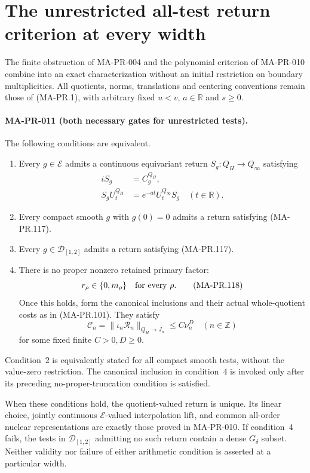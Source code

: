 \section{The unrestricted all-test return criterion at every width}
\label{sec:all-width-return-corollary}

The finite obstruction of MA-PR-004 and the polynomial
criterion of MA-PR-010 combine into an exact characterization
without an initial restriction on boundary multiplicities.
All quotients, norms, translations and centering conventions
remain those of (MA-PR.1), with arbitrary fixed \(u<v\),
\(a\in\mathbb R\) and \(s\ge0\).

\paragraph{MA-PR-011 (both necessary gates for unrestricted tests).}
The following conditions are equivalent.
\begin{enumerate}
\item Every \(g\in\mathcal E\) admits a continuous
equivariant return \(S_g:Q_H\to Q_\infty\) satisfying
\[
 \begin{aligned}
          iS_g&=C_g^{Q_H},\\
          S_gU_t^{Q_H}&=e^{-at}U_t^{Q_\infty}S_g
                         \quad(t\in\mathbb R).
 \end{aligned}
 \tag{MA-PR.117}
\]
\item Every compact smooth \(g\) with \(g(0)=0\)
admits a return satisfying (MA-PR.117).
\item Every \(g\in\mathcal D_{[1,2]}\) admits a return
satisfying (MA-PR.117).
\item There is no proper nonzero retained primary factor:
\[
                  r_\rho\in\{0,m_\rho\}
                             \quad\hbox{for every }\rho.
 \tag{MA-PR.118}
\]
Once this holds, form the canonical inclusions and their
actual whole-quotient costs as in (MA-PR.101).  They satisfy
\[
       \mathcal C_n=\|\iota_n\mathscr R_n\|_{Q_H\to J_n}
                    \le C\nu_n^D
                 \quad(n\in\mathbb Z)
 \tag{MA-PR.119}
\]
for some fixed finite \(C>0,D\ge0\).
\end{enumerate}
Condition~2 is equivalently stated for all compact smooth
tests, without the value-zero restriction.
The canonical inclusion in condition~4 is invoked only
after its preceding no-proper-truncation condition is satisfied.

When these conditions hold, the quotient-valued return
is unique.  Its linear choice, jointly continuous
\(\mathcal E\)-valued interpolation lift, and common
all-order nuclear representations are exactly those
proved in MA-PR-010.  If condition~4 fails, the tests
in \(\mathcal D_{[1,2]}\) admitting no such return
contain a dense \(G_\delta\) subset.
Neither validity nor failure of either arithmetic
condition is asserted at a particular width.

